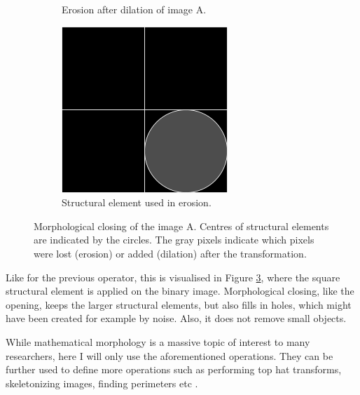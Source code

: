 \documentclass[
  digital,     %
  oneside,     %
  nosansbold,  %
  nocolorbold, %
  lof,         %
  lot,         %
]{fithesis4}
\begin{document}
\begin{figure}
\begin{subfigure}[t]{0.4\textwidth}
        \caption{Erosion after dilation of image A.}
        \label{fig:opening_dilation}
    \end{subfigure}
    \begin{subfigure}[t]{0.2\textwidth}
        \centering
        \includegraphics[width=\textwidth]{resources/inkscape/opening_dilation_se.png}
        \caption{Structural element used in erosion.}
        \label{fig:closing_dilation_se}
    \end{subfigure}
    \caption{Morphological closing of the image A. Centres of structural
    elements are indicated by the circles. The gray pixels indicate which pixels
    were lost (erosion) or added (dilation) after the transformation.}
    \label{fig:closing}
\end{figure}

Like for the previous operator, this is visualised in Figure \ref{fig:closing},
where the square structural element is applied on the binary image. 
Morphological closing, like the opening, keeps the larger structural elements,
but also fills in holes, which might have been created for example by noise.
Also, it does not remove small objects.

While mathematical morphology is a massive topic of interest to many
researchers, here I will only use the aforementioned operations. They can be
further used to define more operations such as performing top hat transforms,
skeletonizing images, finding perimeters etc \cite{mathworks_morp_oper}.
\end{document}
